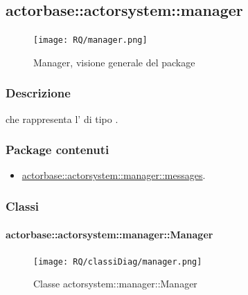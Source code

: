 \documentclass{scalatekids-article}
\begin{document}

\subsection{actorbase::actorsystem::manager}
\label{sec:actorbase::actorsystem::manager}

\begin{figure}[H]
  \begin{center}
    \texttt{[image: RQ/manager.png]}
    \caption{Manager, visione generale del package}
  \end{center}
\end{figure}

\subsubsection{Descrizione}
 che rappresenta l' di tipo .

\subsubsection{Package contenuti}

\begin{itemize}
\item \hyperref[sec:actorbase::actorsystem::manager::messages]{actorbase::actorsystem::manager::messages}.
\end{itemize}

\subsubsection{Classi}

\paragraph{actorbase::actorsystem::manager::Manager}
\label{sec:actorbase::actorsystem::manager::Manager}

\begin{figure}[H]
  \begin{center}
    \texttt{[image: RQ/classiDiag/manager.png]}
    \caption{Classe actorsystem::manager::Manager}
  \end{center}
\end{figure}
\end{document}
